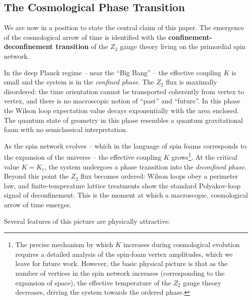 \documentclass[preprint]{SciPost}
\theoremstyle{plain} %
\begin{document}
\subsection{The Cosmological Phase Transition}\label{subsec:cosmological-transition}

We are now in a position to state the central claim of this paper. The emergence of the cosmological arrow of time is identified with the \textbf{confinement-deconfinement transition} of the $ Z_2 $ gauge theory living on the primordial spin network.

In the deep Planck regime -- near the ``Big Bang'' -- the effective coupling $ K $ is small and the system is in the \emph{confined phase}. The $ Z_2 $ flux is maximally disordered: the time orientation cannot be transported coherently from vertex to vertex, and there is no macroscopic notion of ``past'' and ``future''. In this phase the Wilson loop expectation value decays exponentially with the area enclosed. The quantum state of geometry in this phase resembles a quantum gravitational foam with no semiclassical interpretation.

As the spin network evolves -- which in the language of spin foams corresponds to the expansion of the universe -- the effective coupling $ K $ grows\footnote{The precise mechanism by which $ K $ increases during cosmological evolution requires a detailed analysis of the spin-foam vertex amplitudes, which we leave for future work. However, the basic physical picture is that as the number of vertices in the spin network increases (corresponding to the expansion of space), the effective temperature of the $ Z_2 $ gauge theory decreases, driving the system towards the ordered phase.}. At the critical value $ K = K_c $, the system undergoes a phase transition into the \emph{deconfined phase}. Beyond this point the $ Z_2 $ flux becomes ordered: Wilson loops obey a perimeter law, and finite-temperature lattice treatments show the standard Polyakov-loop signal of deconfinement. This is the moment at which a macroscopic, cosmological arrow of time emerges.

Several features of this picture are physically attractive:
\end{document}
